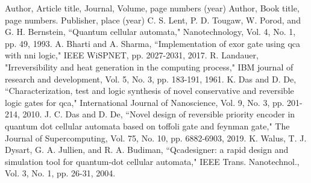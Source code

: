 
\begin{thebibliography}{unstr} 
  
  \addtolength{\itemsep}{-1ex}  %

  Author, Article title, Journal, Volume, page numbers (year)
  Author, Book title, page numbers. Publisher, place (year)
    C. S. Lent, P. D. Tougaw, W. Porod, and G. H. Bernstein, ``Quantum cellular automata," Nanotechnology, Vol. 4, No. 1, pp. 49, 1993.
    A. Bharti and A. Sharma, ``Implementation of exor gate using qca with nni logic," IEEE WiSPNET, pp. 2027-2031, 2017.
    R. Landauer, "Irreversibility and heat generation in the computing process," IBM journal of research and development, Vol. 5, No. 3, pp. 183-191, 1961.
     K. Das and D. De, ``Characterization, test and logic synthesis	of novel conservative and reversible logic gates for qca," International Journal of Nanoscience, Vol. 9, No. 3, pp. 201-214, 2010.
    J. C. Das and D. De, ``Novel design of reversible priority encoder in quantum dot cellular automata based on toffoli gate and feynman gate," The Journal of Supercomputing, Vol. 75, No. 10, pp. 6882-6903, 2019.
    K. Walus, T. J. Dysart, G. A. Jullien, and R. A. Budiman, ``Qcadesigner: a rapid design and simulation tool for quantum-dot cellular automata," IEEE Trans. Nanotechnol., Vol. 3, No. 1, pp. 26-31, 2004.
    
    

\end{thebibliography}





 
  